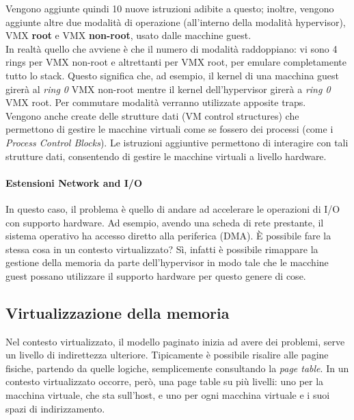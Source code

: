 \documentclass{article}
\begin{document}
		Vengono aggiunte quindi 10 nuove istruzioni adibite a questo; inoltre, vengono aggiunte altre due modalità di operazione (all’interno della modalità hypervisor), VMX \textbf{root} e VMX \textbf{non-root}, usato dalle macchine guest.\\
		In realtà quello che avviene è che il numero di modalità raddoppiano: vi sono 4 rings per VMX non-root e altrettanti per VMX root, per emulare completamente tutto lo stack.
		Questo significa che, ad esempio, il kernel di una macchina guest girerà al
		\emph{ring 0} VMX non-root mentre il kernel dell’hypervisor girerà a \emph{ring 0} VMX root. Per commutare modalità verranno utilizzate apposite traps.\\
		
		Vengono anche create delle strutture dati (VM control structures) che
		permettono di gestire le macchine virtuali come se fossero dei processi (come i \textit{Process Control Blocks}).
		Le istruzioni aggiuntive permettono di
		interagire con tali strutture dati, consentendo di gestire le macchine virtuali a
		livello hardware.
		
		\paragraph{Estensioni Network and I/O}
		In questo caso, il problema è quello di andare ad accelerare le operazioni di I/O con	supporto hardware. Ad esempio, avendo una scheda di rete prestante, il sistema	operativo ha accesso diretto alla periferica (DMA). È possibile fare la stessa cosa in un contesto virtualizzato? Sì, infatti è possibile rimappare la gestione della memoria da parte dell’hypervisor in modo tale che le macchine guest possano utilizzare il supporto hardware per questo genere di cose.
		
		\subsection{Virtualizzazione della memoria}
		Nel contesto virtualizzato, il modello paginato inizia ad avere dei problemi, serve un livello di indirettezza ulteriore.
		Tipicamente è possibile risalire alle pagine fisiche, partendo da quelle logiche, semplicemente consultando la \emph{page table}. In un contesto virtualizzato occorre, però, una page table su più livelli: uno per la macchina virtuale, che sta sull’host, e uno per ogni macchina virtuale e i suoi spazi di indirizzamento.\\
		
\end{document}
